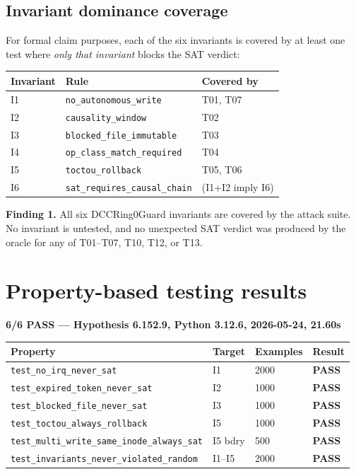 \documentclass[11pt,a4paper]{article}
\theoremstyle{definition}
\begin{document}
\subsection{Invariant dominance coverage}

For formal claim purposes, each of the six invariants is covered by at least
one test where \emph{only that invariant} blocks the SAT verdict:

\begin{center}
\begin{tabular}{lll}
\toprule
Invariant & Rule & Covered by \\
\midrule
I1 & \texttt{no\_autonomous\_write}    & T01, T07 \\
I2 & \texttt{causality\_window}        & T02 \\
I3 & \texttt{blocked\_file\_immutable} & T03 \\
I4 & \texttt{op\_class\_match\_required} & T04 \\
I5 & \texttt{toctou\_rollback}         & T05, T06 \\
I6 & \texttt{sat\_requires\_causal\_chain} & (I1+I2 imply I6) \\
\bottomrule
\end{tabular}
\end{center}

\begin{resultbox}
\textbf{Finding 1.} All six DCCRing0Guard invariants are covered by the
attack suite. No invariant is untested, and no unexpected SAT verdict was
produced by the oracle for any of T01–T07, T10, T12, or T13.
\end{resultbox}

\section{Property-based testing results}

\begin{resultbox}
\textbf{6/6 PASS — Hypothesis 6.152.9, Python 3.12.6, 2026-05-24, 21.60s}
\end{resultbox}

\begin{center}
\begin{tabular}{llll}
\toprule
Property & Target & Examples & Result \\
\midrule
\texttt{test\_no\_irq\_never\_sat}            & I1 & 2000 & \textbf{PASS} \\
\texttt{test\_expired\_token\_never\_sat}     & I2 & 1000 & \textbf{PASS} \\
\texttt{test\_blocked\_file\_never\_sat}      & I3 & 1000 & \textbf{PASS} \\
\texttt{test\_toctou\_always\_rollback}       & I5 & 1000 & \textbf{PASS} \\
\texttt{test\_multi\_write\_same\_inode\_always\_sat} & I5 bdry & 500 & \textbf{PASS} \\
\texttt{test\_invariants\_never\_violated\_random}    & I1–I5 & 2000 & \textbf{PASS} \\
\bottomrule
\end{tabular}
\end{center}
\end{document}
